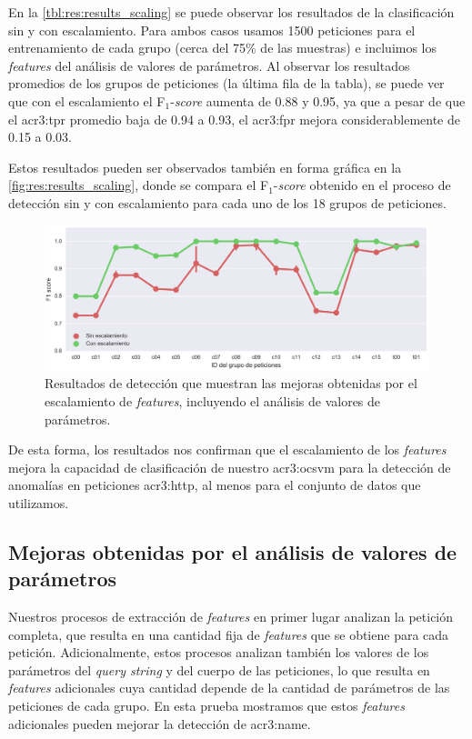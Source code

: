 En la \autoref{tbl:res:results_scaling} se puede observar los resultados
de la clasificación sin y con escalamiento. Para ambos casos usamos 1500
peticiones para el entrenamiento de cada grupo (cerca del 75\% de las
muestras) e incluimos los \textit{features} del análisis de valores de
parámetros.
Al observar los resultados promedios de los grupos de peticiones (la
última fila de la tabla), se puede ver que con el escalamiento el
F$_{1}$-\textit{score} aumenta de \num{0.88} y \num{0.95}, ya que a
pesar de que el \gls{acr3:tpr} promedio baja de \num{0.94} a \num{0.93},
el \gls{acr3:fpr} mejora considerablemente de \num{0.15} a \num{0.03}.

Estos resultados pueden ser observados también en forma gráfica en la
\autoref{fig:res:results_scaling}, donde se compara el F$_{1}$-\textit{score}
obtenido en el proceso de detección sin y con escalamiento para cada
uno de los 18 grupos de peticiones.

\begin{figure}[ht]
    \centering
    \includegraphics[width=\linewidth]{images/results-scaling.png}

    \caption{Resultados de detección que muestran las mejoras obtenidas
        por el escalamiento de \textit{features}, incluyendo el análisis
        de valores de parámetros.}
    \label{fig:res:results_scaling}
\end{figure}

De esta forma, los resultados nos confirman que el escalamiento de los
\textit{features} mejora la capacidad de clasificación de nuestro
\gls{acr3:ocsvm} para la detección de anomalías en peticiones \gls{acr3:http},
al menos para el conjunto de datos que utilizamos.


\subsection{Mejoras obtenidas por el análisis de valores de parámetros}

Nuestros procesos de extracción de \textit{features} en primer lugar
analizan la petición completa, que resulta en una cantidad fija de
\textit{features} que se obtiene para cada petición.
Adicionalmente, estos procesos analizan también los valores de los
parámetros del \textit{query string} y del cuerpo de las peticiones,
lo que resulta en \textit{features} adicionales cuya cantidad depende
de la cantidad de parámetros de las peticiones de cada grupo. En esta
prueba mostramos que estos \textit{features} adicionales pueden mejorar
la detección de \gls{acr3:name}.

